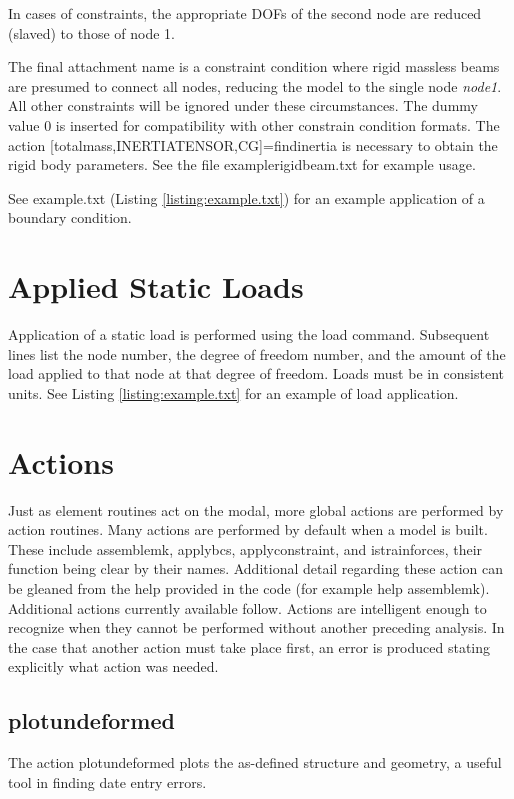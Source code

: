 \documentclass[12pt]{article}
\newcommand*{\command}[1]{\textsf{#1}}
\newcommand*{\variable}[1]{\textit{#1}}
\begin{document}
In cases of constraints, the appropriate DOFs of the second node are reduced (slaved) to those of node 1.

The final attachment name is a constraint condition where rigid massless beams are presumed to connect all nodes, reducing the model to the single node \variable{node1}. All other constraints will be ignored under these circumstances. The dummy value $0$ is inserted for compatibility with other constrain condition formats. The action \command{[totalmass,INERTIATENSOR,CG]=findinertia} is necessary to obtain the rigid body parameters. See the file \textsf{examplerigidbeam.txt} for example usage.


See example.txt (Listing \ref{listing:example.txt}) for an example
application of a boundary condition.

\section{Applied Static Loads}\label{staticloads}
Application of a static load is performed using the \command{load}
command. Subsequent lines list the node number, the degree of freedom
number, and the amount of the load applied to that node at that degree
of freedom. Loads must be in consistent units.  See Listing
\ref{listing:example.txt} for an example of load application.
\section{Actions}\label{sec:actions}
Just as element routines act on the modal, more global actions are performed by action routines. Many actions are performed by default when a model is built. These include \command{assemblemk}, \command{applybcs}, \command{applyconstraint}, and \command{istrainforces}, their function being clear by their names. Additional detail regarding these action can be gleaned from the help provided in the code (for example \command{help assemblemk}). Additional actions currently available follow. Actions are intelligent enough to recognize when they cannot be performed without another preceding analysis. In the case that another action must take place first, an error is produced stating explicitly what action was needed.
\subsection{plotundeformed}
The action \command{plotundeformed} plots the as-defined structure and geometry, a useful tool in finding date entry errors.
\end{document}
